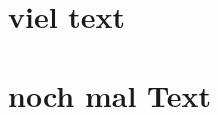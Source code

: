 \documentclass{article}
\begin{document}
\section{viel text}

\newpage
\geometry{a2paper}
\newpage

\section{noch mal Text}
\end{document}
